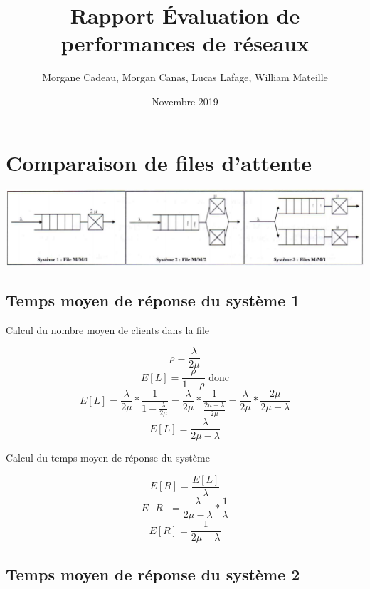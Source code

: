 \documentclass[12pt, a4paper]{article}
\title{Rapport \'Evaluation de performances de r\'eseaux}
\author{Morgane Cadeau, Morgan Canas, Lucas Lafage, William Mateille}
\date{Novembre 2019}
\begin{document}
\maketitle
\thispagestyle{empty}
\newpage
\tableofcontents
\setcounter{page}{1}

\newpage

\section*{Comparaison de files d'attente}
\includegraphics[width=\linewidth]{exercice1}

\subsection*{Temps moyen de r\'eponse du syst\`eme 1}

\quad Calcul du nombre moyen de clients dans la file

\[\rho=\frac{\lambda}{2\mu}\]
\[E[L]=\frac{\rho}{1-\rho} \text{ donc}\]
\[E[L]=\frac{\lambda}{2\mu} * \frac{1}{1-\frac{\lambda}{2\mu}} = \frac{\lambda}{2\mu} * \frac{1}{\frac{2\mu-\lambda}{2\mu}}=\frac{\lambda}{2\mu}*\frac{2\mu}{2\mu-\lambda}\]
\boldmath\[E[L]=\frac{\lambda}{2\mu-\lambda}\]\unboldmath
\linebreak

\quad Calcul du temps moyen de r\'eponse du syst\`eme

\[E[R]=\frac{E[L]}{\lambda}\]
\[E[R]=\frac{\lambda}{2\mu-\lambda}*\frac{1}{\lambda}\]
\boldmath\[E[R]=\frac{1}{2\mu-\lambda}\]\unboldmath
\newpage
\subsection*{Temps moyen de r\'eponse du syst\`eme 2}
\medskip
\end{document}
